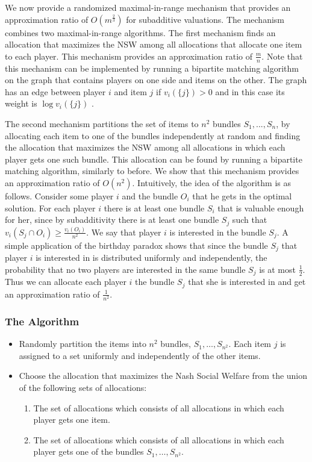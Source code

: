 \documentclass{article}
\begin{document}
We now provide a randomized maximal-in-range mechanism that provides an approximation ratio of $O(m^{\frac 2 3})$ for subadditive valuations. The mechanism combines  two maximal-in-range algorithms. The first mechanism finds an allocation that maximizes the NSW among all allocations that allocate one item to each player. This mechanism provides an approximation ratio of $\frac m n$. Note that this mechanism can be implemented by running a bipartite matching algorithm on the graph that contains players on one side and items on the other. The graph has an edge between player $i$ and item $j$ if $v_i(\{j\})>0$ and in this case its weight is $\log v_i(\{j\})$ .

The second mechanism partitions the set of items to $n^2$ bundles $S_1,...,S_n$, by allocating each item to one of the bundles independently at random and finding the allocation that maximizes the NSW among all allocations in which each player gets one such bundle. This allocation can be found by running a bipartite matching algorithm, similarly to before. We show that this mechanism provides an approximation ratio of $O(n^2)$. Intuitively, the idea of the algorithm is as follows. Consider some player $i$ and the bundle $O_i$ that he gets in the optimal solution. For each player $i$ there is at least one bundle $S_i$ that is valuable enough for her, since by subadditivity there is at least one bundle $S_j$ such that $v_i(S_j\cap O_i)\geq \frac{v_i(O_i)}{n^2}$. We say that player $i$ is interested in the bundle $S_j$. A simple application of the birthday paradox shows that since the bundle $S_j$ that player $i$ is interested in is distributed uniformly and independently, the probability that no two players are interested in the same bundle $S_j$ is at most $\frac 1 2$. Thus we can allocate each player $i$ the bundle $S_j$ that she is interested in and get an approximation ratio of $\frac 1 {n^2}$.


\subsubsection*{The Algorithm}

\begin{itemize}
\item Randomly partition the items into $n^2$ bundles, $S_1,\ldots, S_{n^2}$. Each item $j$ is assigned to a set uniformly and independently of the other items.
\item Choose the allocation that maximizes the Nash Social Welfare from the union of the following sets of allocations:
\begin{enumerate}
\item The set of allocations which consists of all allocations in which each player gets one item.
\item The set of allocations which consists of all allocations in which each player gets one of the bundles $S_1,\ldots, S_{n^2}$.
\end{enumerate}
\end{itemize}
\end{document}
